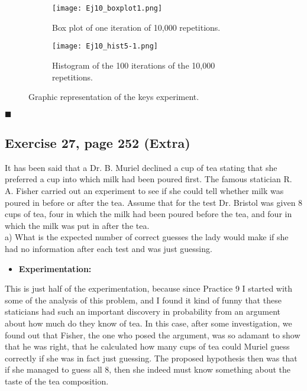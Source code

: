 \documentclass{article}
\begin{document}
\begin{figure}[]
\begin{subfigure}{.5\textwidth}
  \centering
  \texttt{[image: Ej10\_boxplot1.png]}  
  \caption{Box plot of one iteration of 10,000 repetitions. }
  \label{sb5-1}
\end{subfigure}\hspace{5mm}%
\begin{subfigure}{.5\textwidth}
  \centering
  \texttt{[image: Ej10\_hist5-1.png]}  
  \caption{Histogram of the 100 iterations of the 10,000 repetitions.}
  \label{sb5-2}
\end{subfigure}
	\caption{Graphic representation of the keys experiment. }
\label{fig5}
\end{figure}

\begin{flushright}
$\blacksquare$
\end{flushright}


\subsection{Exercise 27, page 252 (Extra)}
 
 It has been said that a Dr. B. Muriel declined a cup of tea stating that she preferred a cup into which milk had been poured first. The famous statician R. A. Fisher carried out an experiment to see if she could tell whether milk was poured in before or after the tea. Assume that for the test Dr. Bristol was given 8 cups of tea, four in which the milk had been poured before the tea, and four in which the milk was put in after the tea.\\
 
 a) What is the expected number of correct guesses the lady would make if she had no information after each test and was just guessing.
 
 
 \begin{itemize}
\item \textbf{Experimentation:}
\end{itemize}

This is just half of the experimentation, because since Practice 9 I started with some of the analysis of this problem, and I found it kind of funny that these staticians had such an important discovery in probability from an argument about how much do they know of tea. In this case, after some investigation, we found out that Fisher, the one who posed the argument, was so adamant to show that he was right, that he calculated how many cups of tea could Muriel guess correctly if she was in fact just guessing. The proposed hypothesis then was that if she managed to guess all 8, then she indeed must know something about the taste of the tea composition.\\
\end{document}
